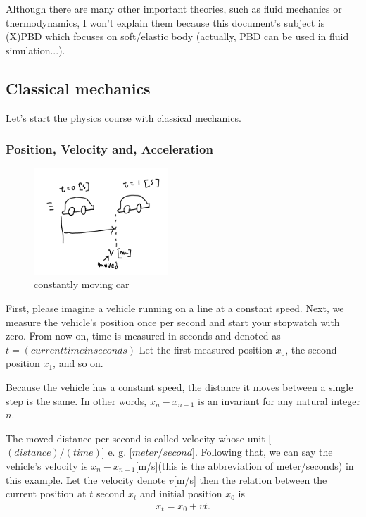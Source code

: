 \documentclass[pdflatex,sn-mathphys-num]{sn-jnl}%
\theoremstyle{thmstyleone}%
\theoremstyle{thmstyletwo}%
\theoremstyle{thmstylethree}%
\begin{document}
Although there are many other important theories, such as fluid mechanics or thermodynamics, I won't explain them because this document's subject is (X)PBD which focuses on soft/elastic body (actually, PBD can be used in fluid simulation...).

\subsection{Classical mechanics}
Let's start the physics course with classical mechanics.
\subsubsection{Position, Velocity and, Acceleration}
\begin{figure}[H]
	\centering
	\includegraphics[width=0.45\textwidth]{images/constCar.png}
	\caption{constantly moving car}
	\label{cscar}
\end{figure}
First, please imagine a vehicle running on a line at a constant speed.
Next, we measure the vehicle's position once per second and start your stopwatch with zero. From now on, time is measured in seconds and denoted as $t = (current time in seconds)$
Let the first measured position $x_0$, the second position $x_1$, and so on.

Because the vehicle has a constant speed, the distance it moves between a single step is the same. In other words, $x_{n}-x_{n-1}$ is an invariant for any natural integer $n$.

The moved distance per second is called velocity whose unit [$(distance)/(time)$] e. g. [$meter/second$]. Following that, we can say the vehicle's velocity is $x_n - x_{n-1}$[m/s](this is the abbreviation of meter/seconds) in this example. Let the velocity denote $v$[m/s] then the relation between the current position at $t$ second $x_t$ and initial position $x_0$ is
\begin{eqnarray}\label{xtx0vt}
	x_t = x_0 + v t .
\end{eqnarray}
\end{document}

